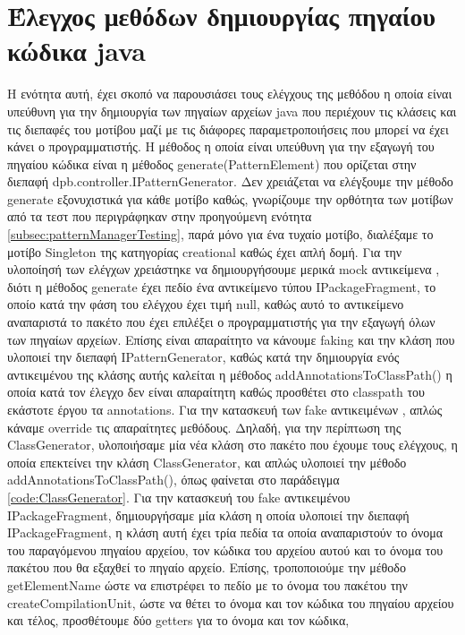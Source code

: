 \section{Έλεγχος μεθόδων δημιουργίας πηγαίου κώδικα java}
\label{sec:patternGeneratorTesting}
Η ενότητα αυτή, έχει σκοπό να παρουσιάσει τους ελέγχους της μεθόδου η οποία είναι υπεύθυνη 
για την δημιουργία των πηγαίων αρχείων java που περιέχουν τις κλάσεις και τις διεπαφές του μοτίβου μαζί με τις 
διάφορες παραμετροποιήσεις που μπορεί να έχει κάνει ο προγραμματιστής. Η μέθοδος η οποία είναι υπεύθυνη για την εξαγωγή 
του πηγαίου κώδικα είναι η μέθοδος generate(PatternElement) που ορίζεται στην διεπαφή dpb.controller.IPatternGenerator. 
Δεν χρειάζεται να ελέγξουμε την μέθοδο generate εξονυχιστικά για κάθε μοτίβο καθώς, γνωρίζουμε την ορθότητα των μοτίβων από τα τεστ που 
περιγράφηκαν στην προηγούμενη ενότητα \ref{subsec:patternManagerTesting}, παρά μόνο για ένα τυχαίο μοτίβο, 
διαλέξαμε το μοτίβο Singleton της κατηγορίας creational καθώς έχει απλή δομή. Για την υλοποίησή των ελέγχων χρειάστηκε να δημιουργήσουμε
μερικά mock αντικείμενα \cite{SWEBOK}, διότι η μέθοδος generate έχει πεδίο ένα αντικείμενο τύπου IPackageFragment, 
το οποίο κατά την φάση του ελέγχου έχει τιμή null, καθώς αυτό το αντικείμενο αναπαριστά το πακέτο που έχει επιλέξει ο προγραμματιστής 
για την εξαγωγή όλων των πηγαίων αρχείων. Επίσης είναι απαραίτητο να κάνουμε faking \cite{SWEBOK} και την κλάση που υλοποιεί
την διεπαφή IPatternGenerator, καθώς κατά την δημιουργία ενός αντικειμένου της κλάσης αυτής καλείται 
η μέθοδος addAnnotationsToClassPath() η οποία κατά τον έλεγχο δεν είναι απαραίτητη καθώς προσθέτει στο classpath του εκάστοτε έργου 
τα annotations. Για την κατασκευή των fake αντικειμένων \cite{SWEBOK}, απλώς κάναμε override τις απαραίτητες μεθόδους.
Δηλαδή, για την περίπτωση της ClassGenerator, υλοποιήσαμε μία νέα κλάση στο πακέτο που έχουμε τους ελέγχους, 
η οποία επεκτείνει την κλάση ClassGenerator, και απλώς υλοποιεί την μέθοδο addAnnotationsToClassPath(), όπως φαίνεται στο παράδειγμα 
\ref{code:ClassGenerator}. Για την κατασκευή του fake αντικειμένου \cite{SWEBOK} IPackageFragment, 
δημιουργήσαμε μία κλάση η οποία υλοποιεί την διεπαφή IPackageFragment, η κλάση αυτή έχει τρία πεδία τα οποία αναπαριστούν 
το όνομα του παραγόμενου πηγαίου αρχείου, τον κώδικα του αρχείου αυτού και το όνομα του πακέτου που θα εξαχθεί το πηγαίο αρχείο. 
Επίσης, τροποποιούμε την μέθοδο getElementName ώστε να επιστρέφει το πεδίο με το όνομα του πακέτου την createCompilationUnit, 
ώστε να θέτει το όνομα και τον κώδικα του πηγαίου αρχείου και τέλος, προσθέτουμε δύο getters για το όνομα και τον κώδικα, 
